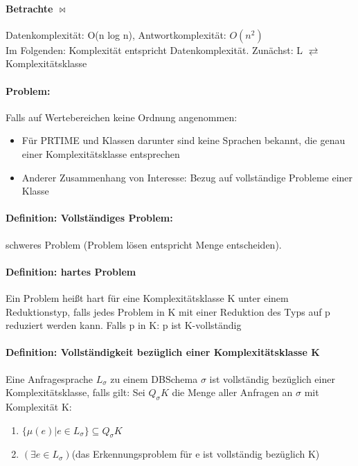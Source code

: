 \documentclass[12pt, a4paper]{article}
\begin{document}
\paragraph{Betrachte $\bowtie$} 
Datenkomplexität: O(n log n), Antwortkomplexität: $O(n^2)$ \\

Im Folgenden: Komplexität entspricht Datenkomplexität. Zunächst: L $\rightleftarrows$ Komplexitätsklasse

\paragraph{Problem:} Falls auf Wertebereichen keine Ordnung angenommen:
\begin{itemize}
	\item Für PRTIME und Klassen darunter sind keine Sprachen bekannt, die genau einer Komplexitätsklasse entsprechen
	\item Anderer Zusammenhang von Interesse: Bezug auf vollständige Probleme einer Klasse
\end{itemize}

\paragraph{Definition: Vollständiges Problem:} schweres Problem (Problem lösen entspricht Menge entscheiden).
\paragraph{Definition: hartes Problem} Ein Problem heißt hart für eine Komplexitätsklasse K unter einem Reduktionstyp, falls jedes Problem in K mit einer Reduktion des Typs auf p reduziert werden kann. Falls p in K: p ist K-vollständig
\paragraph{Definition: Vollständigkeit bezüglich einer Komplexitätsklasse K} Eine Anfragesprache $L_\sigma$ zu einem DBSchema $\sigma$ ist vollständig bezüglich einer Komplexitätsklasse, falls gilt: 
Sei $Q_\sigma K$ die Menge aller Anfragen an $\sigma$ mit Komplexität K:
\begin{enumerate}
	\item $\{ \mu(e) | e \in L_\sigma \} \subseteq Q_\sigma K$
	\item $(\exists e \in L_\sigma)$(das Erkennungsproblem für e ist vollständig bezüglich K)
\end{enumerate}
\end{document}
